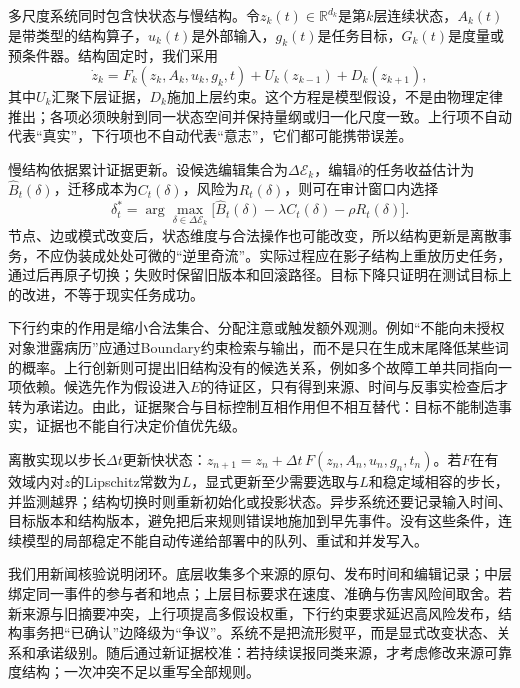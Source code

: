 多尺度系统同时包含快状态与慢结构。令$z_k(t)\in\mathbb R^{d_k}$是第$k$层连续状态，$A_k(t)$是带类型的结构算子，$u_k(t)$是外部输入，$g_k(t)$是任务目标，$G_k(t)$是度量或预条件器。结构固定时，我们采用
\begin{equation}
 \dot z_k=F_k(z_k,A_k,u_k,g_k,t)+U_k(z_{k-1})+D_k(z_{k+1}),
\end{equation}
其中$U_k$汇聚下层证据，$D_k$施加上层约束。这个方程是模型假设，不是由物理定律推出；各项必须映射到同一状态空间并保持量纲或归一化尺度一致。上行项不自动代表“真实”，下行项也不自动代表“意志”，它们都可能携带误差。

慢结构依据累计证据更新。设候选编辑集合为$\Delta\mathcal E_k$，编辑$\delta$的任务收益估计为$\widehat B_t(\delta)$，迁移成本为$C_t(\delta)$，风险为$R_t(\delta)$，则可在审计窗口内选择
\begin{equation}
 \delta_t^*=\arg\max_{\delta\in\Delta\mathcal E_k}\bigl[\widehat B_t(\delta)-\lambda C_t(\delta)-\rho R_t(\delta)\bigr].
\end{equation}
节点、边或模式改变后，状态维度与合法操作也可能改变，所以结构更新是离散事务，不应伪装成处处可微的“逆里奇流”。实际过程应在影子结构上重放历史任务，通过后再原子切换；失败时保留旧版本和回滚路径。目标下降只证明在测试目标上的改进，不等于现实任务成功。

下行约束的作用是缩小合法集合、分配注意或触发额外观测。例如“不能向未授权对象泄露病历”应通过Boundary约束检索与输出，而不是只在生成末尾降低某些词的概率。上行创新则可提出旧结构没有的候选关系，例如多个故障工单共同指向一项依赖。候选先作为假设进入$E$的待证区，只有得到来源、时间与反事实检查后才转为承诺边。由此，证据聚合与目标控制互相作用但不相互替代：目标不能制造事实，证据也不能自行决定价值优先级。

离散实现以步长$\Delta t$更新快状态：$z_{n+1}=z_n+\Delta t\,F(z_n,A_n,u_n,g_n,t_n)$。若$F$在有效域内对$z$的Lipschitz常数为$L$，显式更新至少需要选取与$L$和稳定域相容的步长，并监测越界；结构切换时则重新初始化或投影状态。异步系统还要记录输入时间、目标版本和结构版本，避免把后来规则错误地施加到早先事件。没有这些条件，连续模型的局部稳定不能自动传递给部署中的队列、重试和并发写入。

我们用新闻核验说明闭环。底层收集多个来源的原句、发布时间和编辑记录；中层绑定同一事件的参与者和地点；上层目标要求在速度、准确与伤害风险间取舍。若新来源与旧摘要冲突，上行项提高多假设权重，下行约束要求延迟高风险发布，结构事务把“已确认”边降级为“争议”。系统不是把流形熨平，而是显式改变状态、关系和承诺级别。随后通过新证据校准：若持续误报同类来源，才考虑修改来源可靠度结构；一次冲突不足以重写全部规则。

